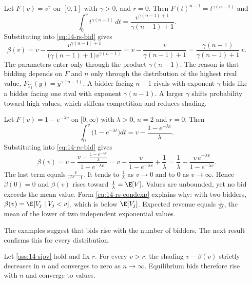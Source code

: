 \begin{example}\label{ex:14-power}
Let $F(v)=v^\gamma$ on $[0,1]$ with $\gamma>0$, and $r=0$. Then $F(t)^{n-1}=t^{\gamma(n-1)}$ and
\[
\int_0^v t^{\gamma(n-1)}\,dt=\frac{v^{\gamma(n-1)+1}}{\gamma(n-1)+1}.
\]
Substituting into \eqref{eq:14-rs-bid} gives
\[
\beta(v)=v-\frac{v^{\gamma(n-1)+1}}{\big(\gamma(n-1)+1\big)v^{\gamma(n-1)}}=v-\frac{v}{\gamma(n-1)+1}=\frac{\gamma(n-1)}{\gamma(n-1)+1}\,v.
\]
The parameters enter only through the product $\gamma(n-1)$. The reason is that bidding depends on $F$ and $n$ only through the distribution of the highest rival value, $F_{Y_1}(y)=y^{\gamma(n-1)}$. A bidder facing $n-1$ rivals with exponent $\gamma$ bids like a bidder facing one rival with exponent $\gamma(n-1)$. A larger $\gamma$ shifts probability toward high values, which stiffens competition and reduces shading.
\end{example}

\begin{example}\label{ex:14-exponential}
Let $F(v)=1-e^{-\lambda v}$ on $[0,\infty)$ with $\lambda>0$, $n=2$ and $r=0$. Then
\[
\int_0^v\big(1-e^{-\lambda t}\big)dt=v-\frac{1-e^{-\lambda v}}{\lambda}.
\]
Substituting into \eqref{eq:14-rs-bid} gives
\[
\beta(v)=v-\frac{v-\frac{1-e^{-\lambda v}}{\lambda}}{1-e^{-\lambda v}}=v-\frac{v}{1-e^{-\lambda v}}+\frac{1}{\lambda}=\frac{1}{\lambda}-\frac{v\,e^{-\lambda v}}{1-e^{-\lambda v}}.
\]
The last term equals $\frac{v}{e^{\lambda v}-1}$. It tends to $\frac{1}{\lambda}$ as $v\to 0$ and to $0$ as $v\to\infty$. Hence $\beta(0)=0$ and $\beta(v)$ rises toward $\frac{1}{\lambda}=\E[V]$. Values are unbounded, yet no bid exceeds the mean value. Form \eqref{eq:14-rs-condexp} explains why: with two bidders, $\beta(v)=\E[V_j\mid V_j<v]$, which is below $\E[V_j]$. Expected revenue equals $\frac{1}{2\lambda}$, the mean of the lower of two independent exponential values.
\end{example}

The examples suggest that bids rise with the number of bidders. The next result confirms this for every distribution.

\begin{proposition}\label{prop:14-fpa-n}
Let \cref{ass:14-sipv} hold and fix $r$. For every $v>r$, the shading $v-\beta(v)$ strictly decreases in $n$ and converges to zero as $n\to\infty$. Equilibrium bids therefore rise with $n$ and converge to values.
\end{proposition}

